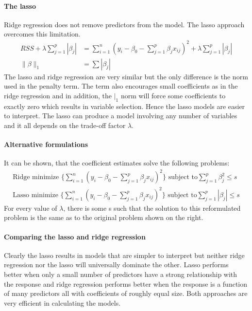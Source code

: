 \documentclass[../document.tex]{subfiles}
\begin{document}
	\paragraph{The lasso}
	Ridge regression does not remove predictors from the model. The lasso approach overcomes this limitation.
	\begin{equation}
	\begin{split}
		RSS+\lambda\sum_{j=1}^{p}|\beta_{j}| &= \sum_{i=1}^{n}(y_{i}-\beta_{0}-\sum_{j=1}^{p}\beta_{j}x_{ij})^2+\lambda\sum_{j=1}^{p}|\beta_{j}|\\
		\|\beta\|_{1}&=\sum|\beta_{j}|
	\end{split}
	\end{equation}
	The lasso and ridge regression are very similar but the only difference is the norm used in the penalty term. The term also encourages small coefficients as in the ridge regression and in addition, the \(|_{1}\) norm will force some coefficients to exactly zero which results in variable selection. Hence the lasso models are easier to interpret. The lasso can produce a model involving any number of variables and it all depends on the trade-off factor \(\lambda\).

	\paragraph{Alternative formulations}
	It can be shown, that the coefficient estimates solve the following problems:
	\begin{equation}
	\begin{split}
		\text{Ridge minimize }\{\sum_{i=1}^{n}(y_{i}-\beta_{0}-\sum_{j=1}^{p}\beta_{j}x_{ij})^2\}\text{ subject to}\sum_{j=1}^{p}\beta_{j}^2\leq s\\
		\text{Lasso minimize }\{\sum_{i=1}^{n}(y_{i}-\beta_{0}-\sum_{j=1}^{p}\beta_{j}x_{ij})^2\}\text{ subject to}\sum_{j=1}^{p}|\beta_{j}|\leq s
	\end{split}
	\end{equation}
	For every value of \(\lambda\), there is some s such that the solution to this reformulated problem is the same as to the original problem shown on the right.

	\paragraph{Comparing the lasso and ridge regression}
	Clearly the lasso results in models that are simpler to interpret but neither ridge regression nor the lasso will universally dominate the other. Lasso performs better when only a small number of predictors have a strong relationship with the response and ridge regression performs better when the response is a function of many predictors all with coefficients of roughly equal size. Both approaches are very efficient in calculating the models.
\end{document}
